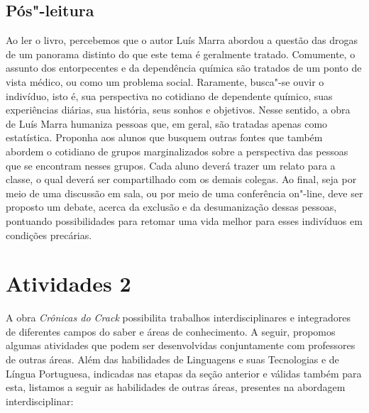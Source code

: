 \documentclass[11pt]{extarticle}
\begin{document}
\subsection{Pós"-leitura}


Ao ler o livro, percebemos que o autor Luís Marra abordou a
questão das drogas de um panorama distinto do que este tema é geralmente
tratado. Comumente, o assunto dos entorpecentes e da dependência química
são tratados de um ponto de vista médico, ou como um problema social.
Raramente, busca"-se ouvir o indivíduo, isto é, sua perspectiva no
cotidiano de dependente químico, suas experiências diárias, sua
história, seus sonhos e objetivos. Nesse sentido, a obra de Luís Marra
humaniza pessoas que, em geral, são tratadas apenas como estatística.
Proponha aos alunos que busquem outras fontes que também abordem o
cotidiano de grupos marginalizados sobre a perspectiva das pessoas que
se encontram nesses grupos. Cada aluno deverá trazer um relato para a
classe, o qual deverá ser compartilhado com os demais colegas. Ao final,
seja por meio de uma discussão em sala, ou por meio de uma conferência
on"-line, deve ser proposto um debate, acerca da exclusão e da
desumanização dessas pessoas, pontuando possibilidades para retomar uma
vida melhor para esses indivíduos em condições precárias.

\section{Atividades 2}


A obra \emph{Crônicas do Crack} possibilita trabalhos interdisciplinares
e integradores de diferentes campos do saber e áreas de conhecimento. A
seguir, propomos algumas atividades que podem ser desenvolvidas
conjuntamente com professores de outras áreas. Além das habilidades de
Linguagens e suas Tecnologias e de Língua Portuguesa, indicadas nas
etapas da seção anterior e válidas também para esta, listamos a seguir
as habilidades de outras áreas, presentes na abordagem interdisciplinar:
\end{document}
